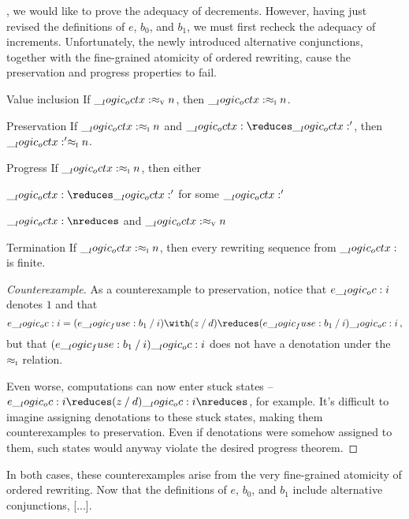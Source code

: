 , we would like to prove the adequacy of decrements.
However, having just revised the definitions of $e$, $b_0$, and $b_1$, we must first recheck the adequacy of increments.
%
Unfortunately, the newly introduced alternative conjunctions, together with the fine-grained atomicity of ordered rewriting, cause the preservation and progress properties to fail.
%
\begin{falseclaim}%
  \leavevmode
  \begin{thmdescription}
  \item[Value inclusion]
    If $\__logic_octx: \approx\sb{\text{\normalfont\scshape v}} n$, then $\__logic_octx: \approx\sb{\text{\normalfont\scshape i}} n$.
  \item[Preservation]
    If $\__logic_octx: \approx\sb{\text{\normalfont\scshape i}} n$ and $\octx \reduces \octx'$, then $\__logic_octx:' \approx\sb{\text{\normalfont\scshape i}} n$.
  \item[Progress]
    If $\__logic_octx: \approx\sb{\text{\normalfont\scshape i}} n$, then either%
    \begin{itemize*}[
      mode=unboxed, label=, afterlabel=,
      before=\unskip:\space,
      itemjoin=;\space, itemjoin*=; or\space%
    ]  
    \item $\octx \reduces \octx'$ for some $\__logic_octx:'$
    \item $\octx \nreduces$ and $\__logic_octx: \approx\sb{\text{\normalfont\scshape v}} n$
    \end{itemize*}
  \item[Termination]
    If $\__logic_octx: \approx\sb{\text{\normalfont\scshape i}} n$, then every rewriting sequence from $\__logic_octx:$ is finite.
  \end{thmdescription}
\end{falseclaim}
\begin{proof}[Counterexample]
  As a counterexample to preservation, notice that $e \__logic_oc: i$ denotes $1$ and that
\begin{equation*}
  e \oc i = (e \fuse b_1 \pmir i) \with (z \pmir d)
    \reduces (e \fuse b_1 \pmir i) \oc i
  \,,
\end{equation*}
but that $(e \__logic_fuse: b_1 \mathbin { / } i) \__logic_oc: i$ does not have a denotation under the $ \approx\sb{\text{\normalfont\scshape i}} $ relation.

  Even worse, computations can now enter stuck states -- $e \oc i \reduces (z \pmir d) \oc i \nreduces$, for example.
  It's difficult to imagine assigning denotations to these stuck states, making them counterexamples to preservation.
  Even if denotations were somehow assigned to them, such states would anyway violate the desired progress theorem.
\end{proof}

In both cases, these counterexamples arise from the very fine-grained atomicity of ordered rewriting.
Now that the definitions of $e$, $b_0$, and $b_1$ include alternative conjunctions, [...].

